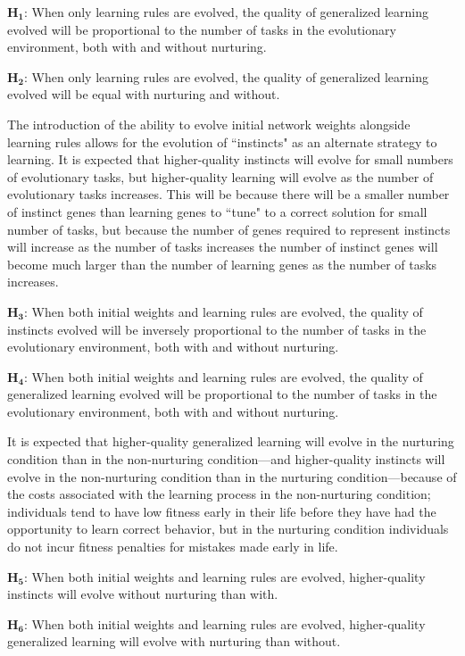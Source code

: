 \documentclass[master]{outhesis}
\begin{document}
$\mathbf{H_1}$: When only learning rules are evolved, the quality of generalized learning evolved will be proportional to the number of tasks in the evolutionary environment, both with and without nurturing.

$\mathbf{H_2}$: When only learning rules are evolved, the quality of generalized learning evolved will be equal with nurturing and without.

The introduction of the ability to evolve initial network weights alongside learning rules allows for the evolution of ``instincts" as an alternate strategy to learning.
It is expected that higher-quality instincts will evolve for small numbers of evolutionary tasks, but higher-quality learning will evolve as the number of evolutionary tasks increases.
This will be because there will be a smaller number of instinct genes than learning genes to ``tune" to a correct solution for small number of tasks, but because the number of genes required to represent instincts will increase as the number of tasks increases the number of instinct genes will become much larger than the number of learning genes as the number of tasks increases.

$\mathbf{H_3}$: When both initial weights and learning rules are evolved, the quality of instincts evolved will be inversely proportional to the number of tasks in the evolutionary environment, both with and without nurturing.

$\mathbf{H_4}$: When both initial weights and learning rules are evolved, the quality of generalized learning evolved will be proportional to the number of tasks in the evolutionary environment, both with and without nurturing.

It is expected that higher-quality generalized learning will evolve in the nurturing condition than in the non-nurturing condition---and higher-quality instincts will evolve in the non-nurturing condition than in the nurturing condition---because of the costs associated with the learning process in the non-nurturing condition; individuals tend to have low fitness early in their life before they have had the opportunity to learn correct behavior, but in the nurturing condition individuals do not incur fitness penalties for mistakes made early in life.

$\mathbf{H_5}$: When both initial weights and learning rules are evolved, higher-quality instincts will evolve without nurturing than with.

$\mathbf{H_6}$: When both initial weights and learning rules are evolved, higher-quality generalized learning will evolve with nurturing than without.
\end{document}
